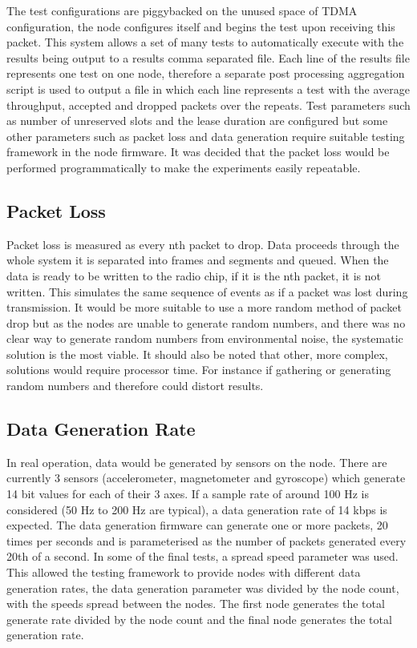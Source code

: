 \documentclass[parskip]{cs4rep}
\begin{document}
The test configurations are piggybacked on the unused space of TDMA configuration, the node configures itself and begins the test upon receiving this packet. This system allows a set of many tests to automatically execute with the results being output to a results comma separated file. Each line of the results file represents one test on one node, therefore a separate post processing aggregation script is used to output a file in which each line represents a test with the average throughput, accepted and dropped packets over the repeats. Test parameters such as number of unreserved slots and the lease duration are configured but some other parameters such as packet loss and data generation require suitable testing framework in the node firmware. It was decided that the packet loss would be performed programmatically to make the experiments easily repeatable.

\subsection{Packet Loss}

Packet loss is measured as every nth packet to drop. Data proceeds through the whole system it is separated into frames and segments and queued. When the data is ready to be written to the radio chip, if it is  the nth packet, it is not written. This simulates the same sequence of events as if a packet was lost during transmission. It would be more suitable to use a more random method of packet drop but as the nodes are unable to generate random numbers, and there was no clear way to generate random numbers from environmental noise, the systematic solution is the most viable. It should also be noted that other, more complex, solutions would require processor time. For instance if gathering or generating random numbers and therefore could distort results.

\subsection{Data Generation Rate}

In real operation, data would be generated by sensors on the node. There are currently 3 sensors (accelerometer, magnetometer and gyroscope) which generate 14 bit values for each of their 3 axes. If a sample rate of around 100 Hz is considered (50 Hz to 200 Hz are typical), a data generation rate of 14 kbps is expected. The data generation firmware can generate one or more packets, 20 times per seconds and is parameterised as the number of packets generated every 20th of a second. In some of the final tests, a spread speed parameter was used. This allowed the testing framework to provide nodes with different data generation rates, the data generation parameter was divided by the node count, with the speeds spread between the nodes. The first node generates the total generate rate divided by the node count and the final node generates the total generation rate.
\end{document}
